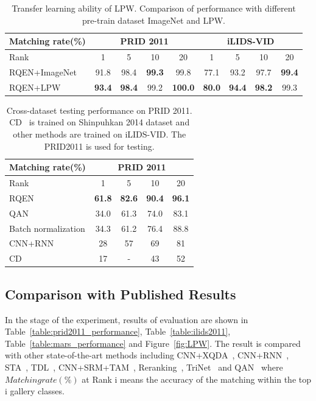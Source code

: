 \documentclass[letterpaper]{article} %
\begin{document}
\begin{table}[t]
\centering
\caption{Transfer learning ability of LPW. Comparison of performance with different pre-train dataset ImageNet and LPW.}
\begin{tabular}{l|c|c|c|c|c|c|c|c}
\hline
Matching rate(\%)& \multicolumn{4}{c}{PRID 2011}&\multicolumn{4}{c}{iLIDS-VID}  \\
\hline
 Rank & 1 & 5 & 10 & 20 & 1 & 5 & 10 & 20\\
\hline
RQEN+ImageNet & 91.8 & 98.4& \bf{99.3} & 99.8 & 77.1 & 93.2 & 97.7 & \bf{99.4}\\
RQEN+LPW & \bf{93.4} & \bf{98.4} & 99.2 & \bf{100.0} & \bf{80.0} & \bf{94.4} & \bf{98.2} & 99.3\\
\hline
\end{tabular}
\label{table:eva}
\end{table}

\begin{table}[t]
\centering
\caption{Cross-dataset testing performance on PRID 2011. CD~\cite{hu2014cross} is trained on Shinpuhkan 2014 dataset and other methods are trained on iLIDS-VID. The PRID2011 is used for testing.}
{
\begin{tabular}{l|c|c|c|c}
\hline
Matching rate(\%)& \multicolumn{4}{c}{PRID 2011} \\
\hline
 Rank & 1 & 5 & 10 & 20 \\
\hline
RQEN & {\bf61.8} & {\bf82.6} & {\bf90.4} & {\bf96.1} \\
QAN &34.0 &61.3 & 74.0 &83.1 \\
Batch normalization & 34.3 & 61.2 & 76.4 & 88.8 \\
CNN+RNN& 28 & 57 & 69 & 81 \\
CD~\cite{hu2014cross} & 17 & - & 43 & 52 \\
\hline
\end{tabular}}

\label{table:crossp}
\end{table}

\subsection{Comparison with Published Results}
In the stage of the experiment, results of evaluation are shown in Table~\ref{table:prid2011_performance}, Table~\ref{table:ilids2011}, Table~\ref{table:mars_performance} and Figure~\ref{fig:LPW}. The result is compared with other state-of-the-art methods including CNN+XQDA~\cite{zheng2016mars}, CNN+RNN~\cite{mclaughlin2016recurrent}, STA~\cite{liu2015spatio}, TDL~\cite{you2016top}, CNN+SRM+TAM~\cite{tn2017see}, Reranking~\cite{Zhong_2017_CVPR}, TriNet~\cite{Li_2017_CVPR} and QAN~\cite{yu2017quality} where $Matching rate(\%)$ at Rank i means the accuracy of the matching within the top i gallery classes.
\end{document}
